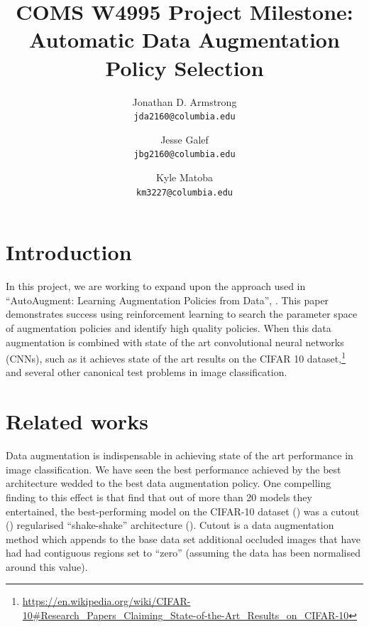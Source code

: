 \documentclass[10pt,twocolumn,letterpaper]{article}
\begin{document}
\title{COMS W4995 Project Milestone: Automatic Data Augmentation Policy Selection}
\author{Jonathan D. Armstrong\\
{\tt\small jda2160@columbia.edu}
\and
Jesse Galef\\
{\tt\small jbg2160@columbia.edu}
\and
Kyle Matoba\\
{\tt\small km3227@columbia.edu}
}

\maketitle



\section{Introduction}

In this project, we are working to expand upon the approach used in ``AutoAugment: Learning Augmentation Policies from Data'', \cite{Cubuk2018}. This paper demonstrates success using reinforcement learning to search the parameter space of augmentation policies and identify high quality policies. When this data augmentation is combined with state of the art convolutional neural networks (CNNs), such as \cite{Yamada2018} it achieves state of the art results on the CIFAR 10 dataset,\footnote{\url{https://en.wikipedia.org/wiki/CIFAR-10\#Research\_Papers\_Claiming\_State-of-the-Art\_Results\_on\_CIFAR-10}} and several other canonical test problems in image classification.

\section{Related works}

Data augmentation is indispensable in achieving state of the art performance in image classification. We have seen the best performance achieved by the best architecture wedded to the best data augmentation policy.  One compelling finding to this effect is that \cite{Recht2018} find that out of more than 20 models they entertained, the best-performing model on the CIFAR-10 dataset (\cite{Krizhevsk2009}) was a cutout (\cite{Devries2017}) regularised ``shake-shake'' architecture (\cite{Gastaldi2017}). Cutout is a data augmentation method which appends to the base data set additional occluded images that have had had contiguous regions set to ``zero'' (assuming the data has been normalised around this value). 
\end{document}
